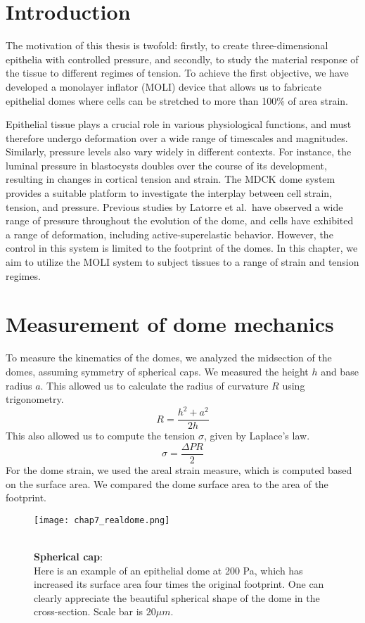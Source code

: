 \hypertarget{introduction}{%
\section{Introduction}\label{introduction2}}

The motivation of this thesis is twofold: firstly, to create
three-dimensional epithelia with controlled pressure, and secondly, to
study the material response of the tissue to different regimes of
tension. To achieve the first objective, we have developed a monolayer
inflator (MOLI) device that allows us to fabricate epithelial domes
where cells can be stretched to more than 100\% of area strain.

Epithelial tissue plays a crucial role in various physiological
functions, and must therefore undergo deformation over a wide range of
timescales and magnitudes. Similarly, pressure levels also vary widely
in different contexts. For instance, the luminal pressure in blastocysts
doubles over the course of its development, resulting in changes in
cortical tension and strain. The MDCK dome system provides a suitable
platform to investigate the interplay between cell strain, tension, and
pressure. Previous studies by Latorre et al.~have observed a wide range
of pressure throughout the evolution of the dome, and cells have
exhibited a range of deformation, including active-superelastic
behavior. However, the control in this system is limited to the
footprint of the domes. In this chapter, we aim to utilize the MOLI
system to subject tissues to a range of strain and tension regimes.
\hypertarget{measurement-of-dome-mechanics}{%
	\section{Measurement of dome
		mechanics}\label{measurement-of-dome-mechanics}}

To measure the kinematics of the domes, we analyzed the midsection of
the domes, assuming symmetry of spherical caps. We measured the height
\(h\) and base radius \(a\). This allowed us to calculate the radius of
curvature \(R\) using trigonometry. \[ R = \frac{h^2 + a^2}{2h} \] This
also allowed us to compute the tension \(\sigma\), given by Laplace's
law. \[\sigma = \frac{\Delta PR }{2}\] For the dome strain, we used the
areal strain measure, which is computed based on the surface area. We
compared the dome surface area to the area of the footprint.

\begin{figure}
	\begin{minipage}[c]{0.7\textwidth}
		\texttt{[image: chap7\_realdome.png]}
	\end{minipage}\hfill
	\begin{minipage}[c]{0.27\textwidth}
		\caption{\\ \textbf{Spherical cap}:\\Here is an example of an epithelial dome at 200 Pa, which has increased its surface area four times the original footprint. One can clearly appreciate the beautiful spherical shape of the dome in the cross-section. Scale bar is $20 \mu m$.
		} \label{fig_7_1}
	\end{minipage}
\end{figure}


